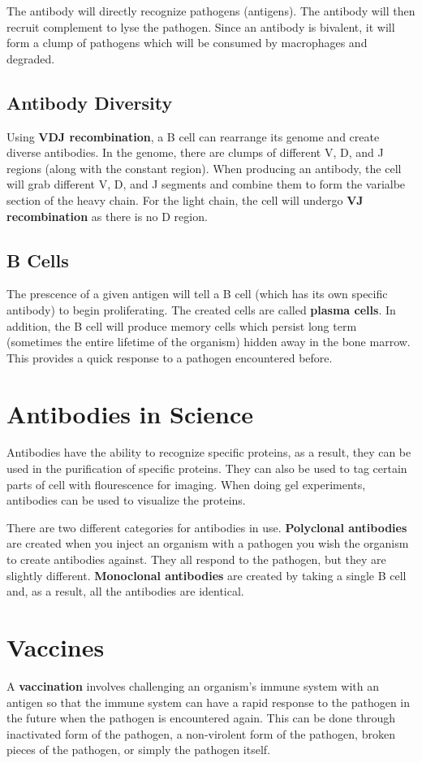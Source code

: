 \documentclass{article}
\begin{document}
The antibody will directly recognize pathogens (antigens). The antibody will
then recruit complement to lyse the pathogen. Since an antibody is bivalent, it
will form a clump of pathogens which will be consumed by macrophages and
degraded.

\subsection{ Antibody Diversity }

Using \textbf{VDJ recombination}, a B cell can rearrange its genome and create
diverse antibodies. In the genome, there are clumps of different V, D, and J
regions (along with the constant region). When producing an antibody, the cell
will grab different V, D, and J segments and combine them to form the varialbe
section of the heavy chain. For the light chain, the cell will undergo
\textbf{VJ recombination} as there is no D region. 

\subsection{ B Cells }

The prescence of a given antigen will tell a B cell (which has its own specific
antibody) to begin proliferating. The created cells are called \textbf{plasma
cells}. In addition, the B cell will produce memory cells which persist long
term (sometimes the entire lifetime of the organism) hidden away in the bone
marrow. This provides a quick response to a pathogen encountered before. 

\section{ Antibodies in Science }

Antibodies have the ability to recognize specific proteins, as a result, they
can be used in the purification of specific proteins. They can also be used to
tag certain parts of cell with flourescence for imaging. When doing gel
experiments, antibodies can be used to visualize the proteins. 

There are two different categories for antibodies in use. \textbf{Polyclonal
antibodies} are created when you inject an organism with a pathogen you wish the
organism to create antibodies against. They all respond to the pathogen, but
they are slightly different. \textbf{Monoclonal antibodies} are created by
taking a single B cell and, as a result, all the antibodies are identical. 

\section{ Vaccines }

A \textbf{vaccination} involves challenging an organism's immune system with an
antigen so that the immune system can have a rapid response to the pathogen in
the future when the pathogen is encountered again. This can be done through
inactivated form of the pathogen, a non-virolent form of the pathogen, broken
pieces of the pathogen, or simply the pathogen itself.
\end{document}
